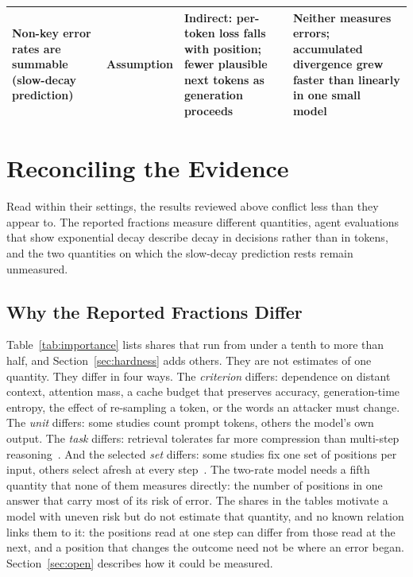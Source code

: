 \documentclass{ieeeaccess}
\newcommand{\rowgap}{\addlinespace[2.5pt]}
\begin{document}
\begin{table}[!t]
\begin{tabular}{@{}>{\raggedright\arraybackslash}p{2.8cm}>{\raggedright\arraybackslash}p{1.6cm}>{\raggedright\arraybackslash}p{5.6cm}>{\raggedright\arraybackslash}p{6.45cm}@{}}
\rowgap Non-key error rates are summable (slow-decay prediction) & Assumption & Indirect: per-token loss falls with position; fewer plausible next tokens as generation proceeds~\cite{kaplan2020scaling,yang2025horizon} & Neither measures errors; accumulated divergence grew faster than linearly in one small model~\cite{arora2022exposure} \\
\bottomrule
\end{tabular}
\end{table}

\section{Reconciling the Evidence}
\label{sec:reconcile}
Read within their settings, the results reviewed above conflict less than they appear to. The reported fractions measure different quantities, agent evaluations that show exponential decay describe decay in decisions rather than in tokens, and the two quantities on which the slow-decay prediction rests remain unmeasured.

\subsection{Why the Reported Fractions Differ}
Table~\ref{tab:importance} lists shares that run from under a tenth to more than half, and Section~\ref{sec:hardness} adds others. They are not estimates of one quantity. They differ in four ways. The \emph{criterion} differs: dependence on distant context, attention mass, a cache budget that preserves accuracy, generation-time entropy, the effect of re-sampling a token, or the words an attacker must change. The \emph{unit} differs: some studies count prompt tokens, others the model's own output. The \emph{task} differs: retrieval tolerates far more compression than multi-step reasoning~\cite{liu2026semantic}. And the selected \emph{set} differs: some studies fix one set of positions per input, others select afresh at every step~\cite{tang2024quest,li2025scbench}. The two-rate model needs a fifth quantity that none of them measures directly: the number of positions in one answer that carry most of its risk of error. The shares in the tables motivate a model with uneven risk but do not estimate that quantity, and no known relation links them to it: the positions read at one step can differ from those read at the next, and a position that changes the outcome need not be where an error began. Section~\ref{sec:open} describes how it could be measured.
\end{document}
